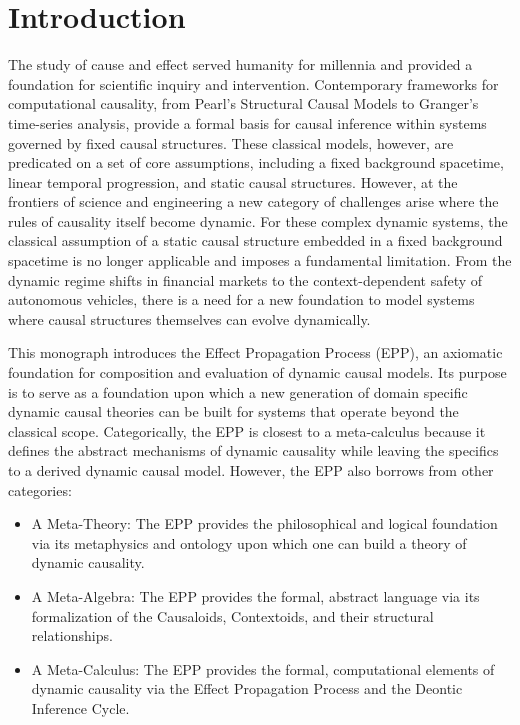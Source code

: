 \section{Introduction}
\label{sec:introduction}

The study of cause and effect served humanity for millennia and provided a foundation for scientific inquiry and intervention. Contemporary frameworks for computational causality, from Pearl's Structural Causal Models to Granger's time-series analysis, provide a formal basis for causal inference within systems governed by fixed causal structures. These classical models, however, are predicated on a set of core assumptions, including a fixed background spacetime, linear temporal progression, and static causal structures. However, at the frontiers of science and engineering a new category of challenges arise where the rules of causality itself become dynamic. For these complex dynamic systems, the classical assumption of a static causal structure embedded in a fixed background spacetime is no longer applicable and imposes a fundamental limitation. From the dynamic regime shifts in financial markets to the context-dependent safety of autonomous vehicles, there is a need for a new foundation to model systems where causal structures themselves can evolve dynamically.

This monograph introduces the Effect Propagation Process (EPP), an axiomatic foundation for composition and evaluation of dynamic causal models. Its purpose is to serve as a foundation upon which a new generation of domain specific dynamic causal theories can be built for systems that operate beyond the classical scope. Categorically, the EPP is closest to a meta-calculus because it defines the abstract mechanisms of dynamic causality while leaving the specifics to a derived dynamic causal model. However, the EPP also borrows from other categories:

\begin{itemize}
\item A Meta-Theory: The EPP provides the philosophical and logical foundation via its metaphysics and ontology upon which one can build a theory of dynamic causality.
\item A Meta-Algebra: The EPP provides the formal, abstract language via its formalization of the Causaloids, Contextoids, and their structural relationships.
\item A Meta-Calculus: The EPP provides the formal, computational elements of dynamic causality via the Effect Propagation Process and the Deontic Inference Cycle.
\end{itemize}

